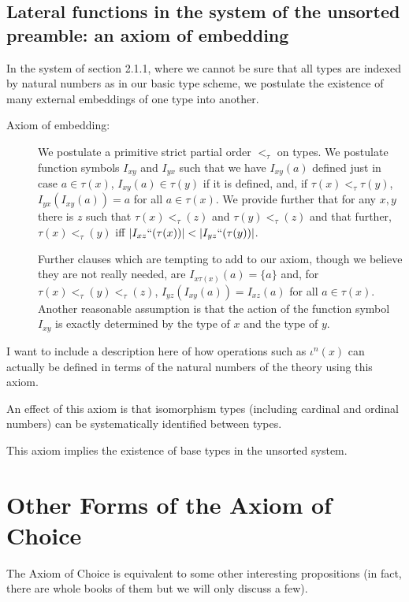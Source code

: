 \documentclass[12pt]{book}
\begin{document}
\subsection{Lateral functions in the system of the unsorted preamble:  an axiom of embedding}

In the system of section 2.1.1,  where we cannot be sure that all types are indexed by natural numbers as in our basic type scheme,
we postulate the existence of many external embeddings of one type into another.

\begin{description}

\item[Axiom of embedding:]  We postulate a primitive strict partial order $<_\tau$ on types.  We postulate function symbols $I_{xy}$ and $I_{yx}$ such
that we have $I_{xy}(a)$ defined just in case $a \in \tau(x)$, $I_{xy}(a) \in \tau(y)$ if it is defined, and, if $\tau(x) <_\tau \tau(y)$,  $I_{yx}(I_{xy}(a)) = a$ for all $a \in \tau(x)$.  We provide further
that for any $x,y$ there is $z$ such that $\tau(x) <_\tau(z)$ and $\tau(y) <_\tau(z)$ and that further, $\tau(x) <_\tau (y)$ iff $|I_{xz}``(\tau(x))| < |I_{yz}``(\tau(y))|$.

Further clauses which are tempting to add to our axiom, though we believe they are not really needed, are $I_{x\tau(x)}(a) = \{a\}$ and, for $\tau(x) <_\tau (y) <_\tau (z)$,
$I_{yz}(I_{xy}(a)) = I_{xz}(a)$ for all $a \in \tau(x)$.  Another reasonable assumption is that the action of the function symbol $I_{xy}$ is exactly determined by the type of $x$
and the type of $y$.

\end{description}

I want to include a description here of how operations such as $\iota^n(x)$ can actually be defined in terms of the natural numbers of the theory using this axiom.

An effect of this axiom is that isomorphism types (including cardinal and ordinal numbers) can be systematically identified between types.

This axiom implies the existence of base types in the unsorted system.

\newpage

\section{Other Forms of the Axiom of Choice}

The Axiom of Choice is equivalent to some other interesting
propositions (in fact, there are whole books of them but we will only
discuss a few).
\end{document}
